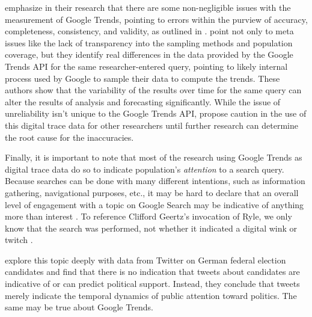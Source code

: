 \citet{cebrian_domenech22} emphasize in their research that there are some
non-negligible issues with the measurement of Google Trends, pointing to errors
within the purview of accuracy, completeness, consistency, and validity, as
outlined in \citet{KarrDataQuality}. 
\citet{cebrian_domenech22} point not only
to meta issues like the lack of transparency into the sampling methods and
population coverage, but they identify real differences in the data provided by
the Google Trends API for the same researcher-entered query, pointing to likely
internal process used by Google to sample their data to compute the trends.
These authors show that the variability of the results over time for the same
query can alter the results of analysis and forecasting significantly. While the
issue of unreliability isn't unique to the Google Trends API,
\citet{cebrian_domenech22} propose caution in the use of this digital trace data
for other researchers until further research can determine the root cause for
the inaccuracies.

Finally, it is important to note that most of the research using Google Trends
as digital trace data do so to indicate population's \textit{attention} to a
search query. Because searches can be done with
many different intentions, such as information gathering, navigational purposes,
etc., it may be hard to declare that an overall level of engagement with a topic
on Google Search may be indicative of anything more than interest
\citep{da2011search}. To reference Clifford Geertz's invocation of Ryle, we only
know that the search was performed, not whether it indicated a digital wink or
twitch \citeyearpar{geertz1973thick}.

\citet{jungherr_etal17} explore this topic deeply with data from
Twitter on German federal election candidates and find that there is no
indication that tweets about candidates are indicative of or can predict 
political support. Instead, they conclude that tweets merely indicate the
temporal dynamics of public attention toward politics. The same may
be true about Google Trends. 

